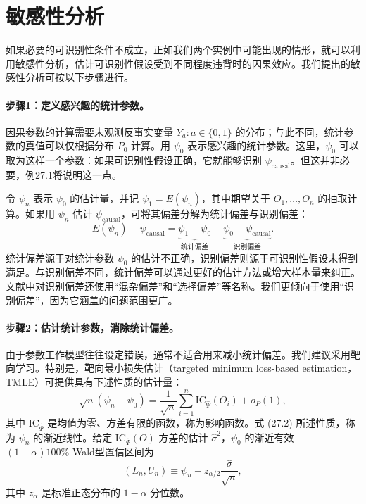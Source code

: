 \section{敏感性分析}

如果必要的可识别性条件不成立，正如我们两个实例中可能出现的情形，就可以利用敏感性分析，估计可识别性假设受到不同程度违背时的因果效应。我们提出的敏感性分析可按以下步骤进行。

\paragraph*{步骤1：定义感兴趣的统计参数。}
因果参数的计算需要未观测反事实变量 $Y_a:a\in\{0,1\}$ 的分布；与此不同，统计参数的真值可以仅根据分布 $P_0$ 计算。用 $\psi_0$ 表示感兴趣的统计参数。这里，$\psi_0$ 可以取为这样一个参数：如果可识别性假设正确，它就能够识别 $\psi_{\mathrm{causal}}$。但这并非必要，例27.1将说明这一点。

令 $\psi_n$ 表示 $\psi_0$ 的估计量，并记 $\psi_1=E(\psi_n)$，其中期望关于 $O_1,\ldots,O_n$ 的抽取计算。如果用 $\psi_n$ 估计 $\psi_{\mathrm{causal}}$，可将其偏差分解为统计偏差与识别偏差：
\[
 E(\psi_n)-\psi_{\mathrm{causal}}
 =\underbrace{\psi_1-\psi_0}_{\text{统计偏差}}
 +\underbrace{\psi_0-\psi_{\mathrm{causal}}}_{\text{识别偏差}}.
\]
统计偏差源于对统计参数 $\psi_0$ 的估计不正确，识别偏差则源于可识别性假设未得到满足。与识别偏差不同，统计偏差可以通过更好的估计方法或增大样本量来纠正。文献中对识别偏差还使用“混杂偏差”和“选择偏差”等名称。我们更倾向于使用“识别偏差”，因为它涵盖的问题范围更广。

\paragraph*{步骤2：估计统计参数，消除统计偏差。}
由于参数工作模型往往设定错误，通常不适合用来减小统计偏差。我们建议采用靶向学习。特别是，靶向最小损失估计（targeted minimum loss-based estimation，TMLE）可提供具有下述性质的估计量：
\begin{equation}
 \sqrt n(\psi_n-\psi_0)
 =\frac1{\sqrt n}\sum_{i=1}^n\mathrm{IC}_{\hat\Psi}(O_i)+o_P(1),
 \tag{27.2}
\end{equation}
其中 $\mathrm{IC}_{\hat\Psi}$ 是均值为零、方差有限的函数，称为影响函数。式 (27.2) 所述性质，称为 $\psi_n$ 的渐近线性。给定 $\mathrm{IC}_{\hat\Psi}(O)$ 方差的估计 $\hat\sigma^2$，$\psi_0$ 的渐近有效 $(1-\alpha)100\%$ Wald型置信区间为
\begin{equation}
 (L_n,U_n)\equiv\psi_n\pm z_{\alpha/2}\frac{\hat\sigma}{\sqrt n},
 \tag{27.3}
\end{equation}
其中 $z_\alpha$ 是标准正态分布的 $1-\alpha$ 分位数。

